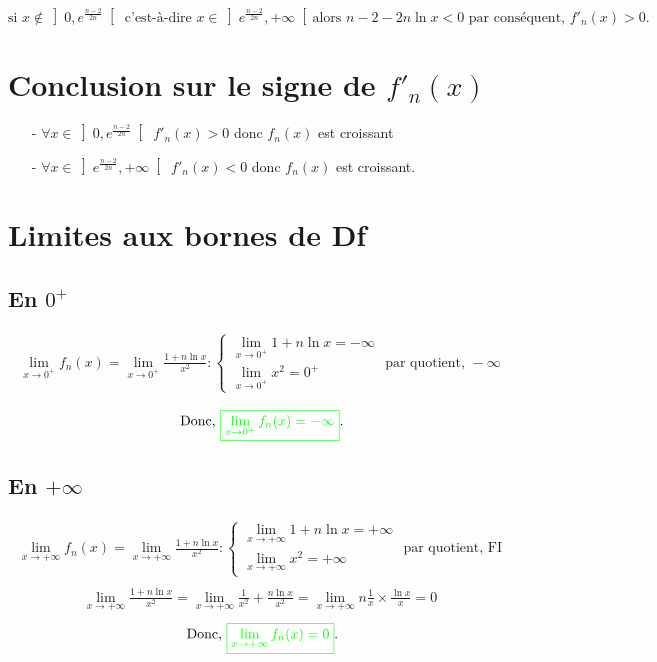 \documentclass[12pt]{article}
\begin{document}
\[\text{si } x\notin \left]0,e^{\frac{n - 2}{2n}}\right[ \text{ c'est-à-dire } x\in \left]e^{\frac{n - 2}{2n}},+\infty\right[ \text{alors } n - 2 - 2n \ln x < 0 \text{ par conséquent, } f'_n(x)>0. \]

\section*{Conclusion sur le signe de \( f'_n(x) \)}
\begin{itemize}
\item[-] \( \forall x\in \left] 0, e^{\frac{n - 2}{2n}}\right[  \) \( f'_n(x) > 0 \) donc $f_n(x)$ est croissant

\item[-] \( \forall x\in  \left] e^{\frac{n - 2}{2n}}, +\infty \right[ \) \( f'_n(x) < 0 \) donc $f_n(x)$ est croissant.
\end{itemize} 

\section*{Limites aux bornes de Df}

\subsection*{En \( 0^+ \)}

\begin{align*}
\lim_{x \to 0^{+}}f_n(x)=\lim_{x \to 0^{+}}\frac{1 + n \ln x}{x^2}:
\begin{cases}
\lim_{x \to 0^{+}}1 + n \ln x=-\infty\\
\lim_{x \to 0^{+}}x^2=0^{+}
\end{cases}
\text{ par quotient, }-\infty
\end{align*}

 \[\text{ Donc, } \textcolor{green}{\boxed{\lim_{x \to 0^+} f_n(x) = -\infty}}.\]

\subsection*{En \(  +\infty \)}

\begin{align*}
\lim_{x \to +\infty }f_n(x)=\lim_{x \to +\infty }\frac{1 + n \ln x}{x^2}:
\begin{cases}
\lim_{x \to +\infty}1 + n \ln x=+\infty\\
\lim_{x \to +\infty}x^2=+\infty
\end{cases}
\text{ par quotient, FI}\\
\end{align*}
\begin{align*}
\lim_{x \to +\infty }\frac{1 + n \ln x}{x^2}=\lim_{x \to +\infty }\frac{1}{x^2}+\frac{ n \ln x}{x^2}=\lim_{x \to +\infty }n\frac{ 1}{x} \times \frac{ \ln x}{x}=0
\end{align*}
\[\text{ Donc, } \textcolor{green}{\boxed{\lim_{x \to +\infty} f_n(x) = 0}}.\]
\end{document}
